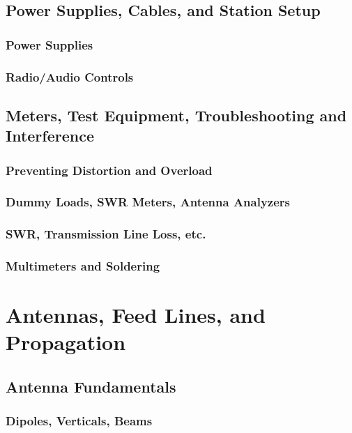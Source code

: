 \documentclass[12pt]{book}
\begin{document}
\chapter{Power Supplies, Cables, and Station Setup}
\section{Power Supplies}

\section{Radio/Audio Controls}

\chapter{Meters, Test Equipment, Troubleshooting and Interference}
\section{Preventing Distortion and Overload}



\section{Dummy Loads, SWR Meters, Antenna Analyzers}
\section{SWR, Transmission Line Loss, etc.}
\section{Multimeters and Soldering}
\part{Antennas, Feed Lines, and Propagation}
\chapter{Antenna Fundamentals}
\section{Dipoles, Verticals, Beams}




\end{document}
